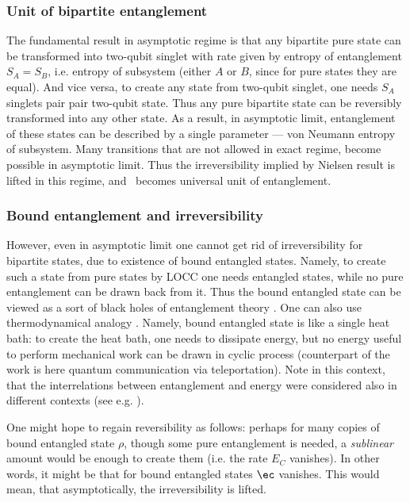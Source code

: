 \documentclass[rmp,12pt,preprint]{revtex4-2}
\begin{document}
\subsubsection{Unit of bipartite entanglement}
The fundamental result in asymptotic regime is that any
bipartite pure state can be transformed into  two-qubit
singlet with rate given by entropy of entanglement $S_A=S_B$, i.e.
entropy of subsystem (either $A$ or $B$, since for pure states they
are equal). And vice versa, to create any state from  two-qubit
singlet, one needs $S_A$ singlets pair pair two-qubit
state. Thus any pure bipartite state can be reversibly transformed
into any other state. As a result, in asymptotic limit, entanglement
of these states can be described by a single parameter --- von Neumann
entropy of subsystem. Many transitions that are not allowed in exact
regime, become possible in asymptotic limit. Thus the
irreversibility implied by Nielsen result is lifted in this regime,
and \eprstate\ becomes universal unit of entanglement.

\subsubsection{Bound entanglement  and irreversibility}
However, even in asymptotic limit one cannot get rid of
irreversibility for bipartite states, due to existence of bound
entangled states.
Namely, to create such a state from pure states by LOCC one needs
entangled states, while no pure entanglement can be drawn back from
it. Thus the bound entangled state can be viewed as a sort of
black holes of entanglement theory \cite{Terhal-PhysTod}. One can
also use thermodynamical analogy \cite{termo,thermo-ent2002}. Namely,
bound entangled state is like a single heat bath: to create the heat
bath, one needs to dissipate energy, but no energy useful to perform
mechanical work can be drawn in cyclic process (counterpart of the work is here
quantum communication via teleportation). Note in this context, that
the interrelations between entanglement and energy were considered also in different
contexts (see e.g. \cite{balance,OsborneN,HughZB-ener-ent}).

One might hope to regain reversibility as follows: perhaps for many
copies of bound entangled  state $\rho$, though some pure
entanglement is needed, a {\it sublinear} amount would be
enough to create them (i.e. the rate $E_C$ vanishes). In other
words, it might be that for bound entangled states $\ec$ vanishes.
This would mean, that asymptotically, the irreversibility is lifted.
\end{document}
